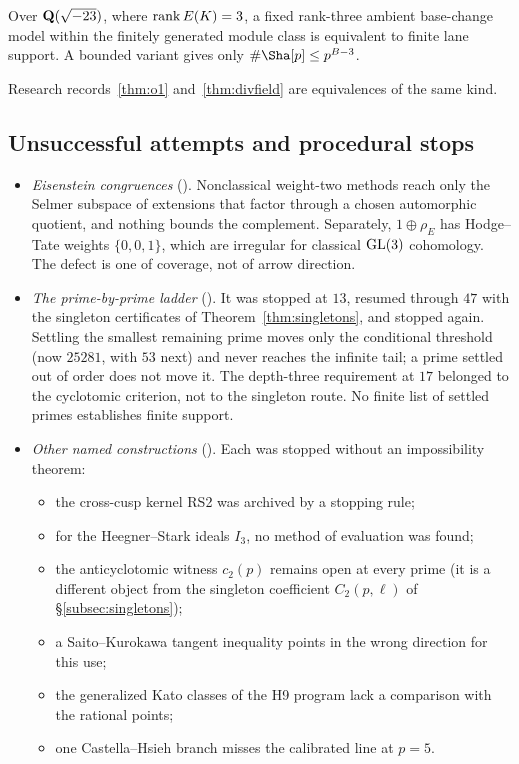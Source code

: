 \begin{researchrecord}\label{obs:stark}
Over $\mathbf{Q}(\sqrt{-23})$, where $\operatorname{rank} E(K)=3$, a fixed rank-three ambient base-change model within the finitely generated module class is equivalent to finite lane support. A bounded variant gives only $\#\Sha[p]\le p^{B-3}$.
\end{researchrecord}
Research records~\ref{thm:o1} and~\ref{thm:divfield} are equivalences of the same kind.

\subsection{Unsuccessful attempts and procedural stops}
\begin{itemize}[leftmargin=*]
\item \emph{Eisenstein congruences} (). Nonclassical weight-two methods reach only the Selmer subspace of extensions that factor through a chosen automorphic quotient, and nothing bounds the complement. Separately, $1\oplus\rho_E$ has Hodge--Tate weights $\{0,0,1\}$, which are irregular for classical $\operatorname{GL}(3)$ cohomology. The defect is one of coverage, not of arrow direction.
\item \emph{The prime-by-prime ladder} (). It was stopped at $13$, resumed through $47$ with the singleton certificates of Theorem~\ref{thm:singletons}, and stopped again. Settling the smallest remaining prime moves only the conditional threshold (now $25281$, with $53$ next) and never reaches the infinite tail; a prime settled out of order does not move it. The depth-three requirement at $17$ belonged to the cyclotomic criterion, not to the singleton route. No finite list of settled primes establishes finite support.
\item \emph{Other named constructions} (). Each was stopped without an impossibility theorem:
\begin{itemize}[leftmargin=*]
\item the cross-cusp kernel RS2 was archived by a stopping rule;
\item for the Heegner--Stark ideals $I_3$, no method of evaluation was found;
\item the anticyclotomic witness $c_2(p)$ remains open at every prime (it is a different object from the singleton coefficient $C_2(p,\ell)$ of \S\ref{subsec:singletons});
\item a Saito--Kurokawa tangent inequality points in the wrong direction for this use;
\item the generalized Kato classes of the H9 program lack a comparison with the rational points;
\item one Castella--Hsieh branch misses the calibrated line at $p=5$.
\end{itemize}
\end{itemize}

